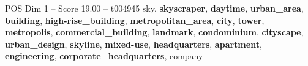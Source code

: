 \begin{textsample}{POS Dim 1 – Score 19.00 – t004945}  \label{ex:f1_pos_020}
sky, \textbf{skyscraper}, \textbf{daytime}, \textbf{urban\_area}, \textbf{building}, \textbf{high-rise\_building}, \textbf{metropolitan\_area}, \textbf{city}, \textbf{tower}, \textbf{metropolis}, \textbf{commercial\_building}, \textbf{landmark}, \textbf{condominium}, \textbf{cityscape}, \textbf{urban\_design}, \textbf{skyline}, \textbf{mixed-use}, \textbf{headquarters}, \textbf{apartment}, \textbf{engineering}, \textbf{corporate\_headquarters}, company

\end{textsample}
